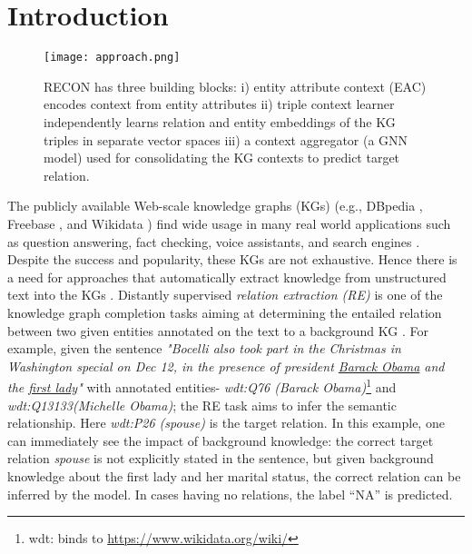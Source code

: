 \documentclass[sigconf]{acmart}
\begin{document}
\maketitle

\section{Introduction}

\begin{figure*}
	\centering
	\texttt{[image: approach.png]}
	\caption{RECON has three building blocks: i) entity attribute context (EAC) encodes context from entity attributes ii) triple context learner independently learns relation and entity embeddings of the KG triples in separate vector spaces iii) a context aggregator (a GNN model) used for consolidating the KG contexts to predict target relation.}
	\label{fig:approach}
	    \vspace{-2mm}
	\end{figure*}

The publicly available Web-scale knowledge graphs (KGs) (e.g., DBpedia \cite{DBLP:conf/semweb/AuerBKLCI07}, Freebase \cite{DBLP:conf/aaai/BollackerCT07}, and Wikidata \cite{DBLP:conf/www/Vrandecic12}) find wide usage in many real world applications such as question answering, fact checking, voice assistants, and search engines \cite{fensel2020we}. Despite the success and popularity, these KGs are not exhaustive. Hence there is a need for approaches that automatically extract knowledge from unstructured text into the KGs \cite{DBLP:conf/aaai/LinLSLZ15}. Distantly supervised \emph{relation extraction (RE)} is one of the knowledge graph completion tasks aiming at determining the entailed relation between two given entities annotated on the text to a background KG \cite{DBLP:conf/aaai/WuFZ19}. For example, given the sentence \textit{"Bocelli also took part in the Christmas in Washington special on Dec 12, in the presence of president \underline{Barack Obama} and the \underline{first lady}"} with annotated entities- \textit{wdt:Q76 (Barack Obama)}\footnote{wdt: binds to \url{https://www.wikidata.org/wiki/}} and \textit{wdt:Q13133(Michelle Obama)};
the RE task aims to infer the semantic relationship. Here \textit{wdt:P26 (spouse)} is the target relation. In this example, one can immediately see the impact of background knowledge: the correct target relation \emph{spouse} is not explicitly stated in the sentence, but given background knowledge about the first lady and her marital status,  the correct relation can be inferred by the model. In cases having no relations, the label ``NA'' is predicted.
\end{document}

